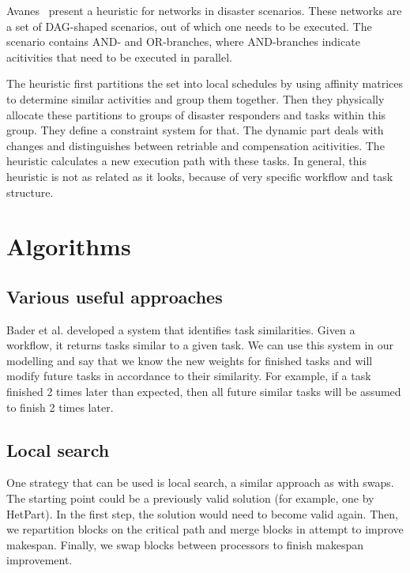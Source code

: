 \documentclass[sigconf,review,anonymous]{acmart}
\begin{document}
    Avanes~\etal\cite{avanes2008adaptive} present a heuristic for networks in disaster scenarios.
    These networks are a set of DAG-shaped scenarios, out of which one needs to be executed.
    The scenario contains AND- and OR-branches, where AND-branches indicate acitivities that need to be executed in parallel.

    The heuristic first partitions the set into local schedules by using affinity matrices to determine similar
    activities and group them together.
    Then they physically allocate these partitions to groups of disaster responders and tasks within this group.
    They define a constraint system for that.
    The dynamic part deals with changes and distinguishes between retriable and compensation acitivities.
    The heuristic calculates a new execution path with these tasks.
    In general, this heuristic is not as related as it looks, because of very specific workflow and task structure.




    \section{Algorithms}

    \subsection{Various useful approaches}

    Bader et al. developed a system that identifies task similarities.
    Given a workflow, it returns tasks similar to a given task.
    We can use this system in our modelling and say that we know the new weights for finished tasks and will modify future tasks in accordance to their similarity.
    For example, if a task finished 2 times later than expected, then all future similar tasks will be assumed to finish 2 times later.

    \subsection{Local search}
    One strategy that can be used is local search, a similar approach as with swaps.
    The starting point could be a previously valid solution (for example, one by HetPart).
    In the first step, the solution would need to become valid again.
    Then, we repartition blocks on the critical path  and merge blocks in attempt to improve makespan.
    Finally, we swap blocks between processors to finish makespan improvement.
\end{document}

